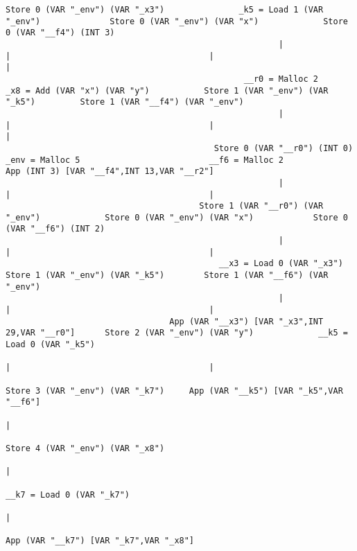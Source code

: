 \begin{landscape}
\begin{lstlisting}[basicstyle=\fontsize{6}{7.5}\selectfont\ttfamily]
                                        Store 0 (VAR "_env") (VAR "_x3")               _k5 = Load 1 (VAR "_env")              Store 0 (VAR "_env") (VAR "x")             Store 0 (VAR "__f4") (INT 3)
                                                       |                                           |                                        |                                         |
                                                __r0 = Malloc 2                      _x8 = Add (VAR "x") (VAR "y")           Store 1 (VAR "_env") (VAR "_k5")         Store 1 (VAR "__f4") (VAR "_env")
                                                       |                                           |                                        |                                         |
                                          Store 0 (VAR "__r0") (INT 0)                      _env = Malloc 5                          __f6 = Malloc 2              App (INT 3) [VAR "__f4",INT 13,VAR "__r2"]
                                                       |                                           |                                        |
                                       Store 1 (VAR "__r0") (VAR "_env")             Store 0 (VAR "_env") (VAR "x")            Store 0 (VAR "__f6") (INT 2)
                                                       |                                           |                                        |
                                           __x3 = Load 0 (VAR "_x3")                Store 1 (VAR "_env") (VAR "_k5")        Store 1 (VAR "__f6") (VAR "_env")
                                                       |                                           |                                        |
                                 App (VAR "__x3") [VAR "_x3",INT 29,VAR "__r0"]      Store 2 (VAR "_env") (VAR "y")             __k5 = Load 0 (VAR "_k5")
                                                                                                   |                                        |
                                                                                    Store 3 (VAR "_env") (VAR "_k7")     App (VAR "__k5") [VAR "_k5",VAR "__f6"]
                                                                                                   |
                                                                                    Store 4 (VAR "_env") (VAR "_x8")
                                                                                                   |
                                                                                       __k7 = Load 0 (VAR "_k7")
                                                                                                   |
                                                                                 App (VAR "__k7") [VAR "_k7",VAR "_x8"]

\end{lstlisting}
\end{landscape}
\clearpage

